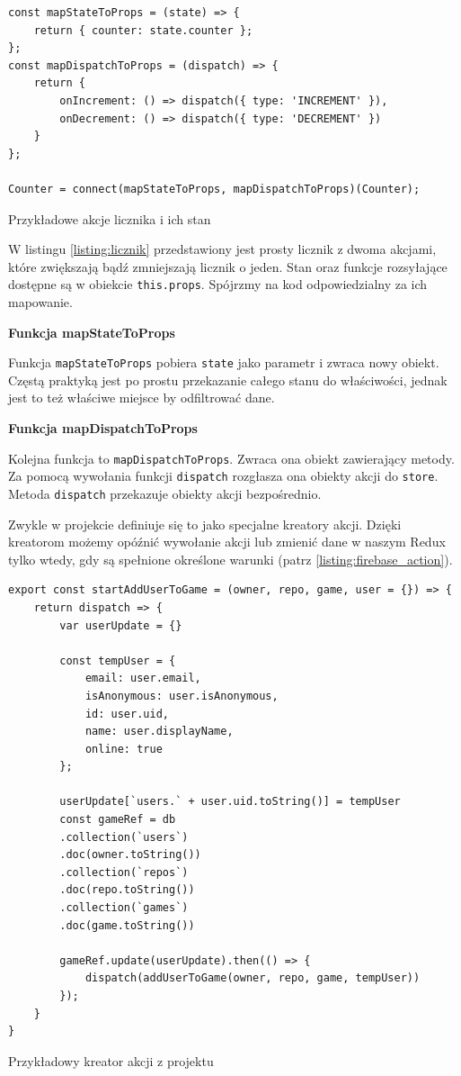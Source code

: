 \begin{listing}
\begin{verbatim}
const mapStateToProps = (state) => {
    return { counter: state.counter };
};
const mapDispatchToProps = (dispatch) => {
    return {
        onIncrement: () => dispatch({ type: 'INCREMENT' }),
        onDecrement: () => dispatch({ type: 'DECREMENT' })
    }
};

Counter = connect(mapStateToProps, mapDispatchToProps)(Counter);
\end{verbatim}
\caption{Przykładowe akcje licznika i ich stan} \label{listing:licznik}
\end{listing}

W listingu \ref{listing:licznik} przedstawiony jest prosty licznik z dwoma akcjami,
które zwiększają bądź zmniejszają licznik o jeden.
Stan oraz funkcje rozsyłające dostępne są w obiekcie \texttt{this.props}.
Spójrzmy na kod odpowiedzialny za ich mapowanie.
\begin{center}
	\textbf{Funkcja mapStateToProps}
\end{center}
Funkcja \texttt{mapStateToProps} pobiera \texttt{state} jako parametr i zwraca nowy obiekt.
Częstą praktyką jest po prostu przekazanie całego stanu do właściwości,
jednak jest to też właściwe miejsce by odfiltrować dane.
\begin{center}
	\textbf{Funkcja mapDispatchToProps}
\end{center}
Kolejna funkcja to \texttt{mapDispatchToProps}. Zwraca ona obiekt zawierający metody.
Za pomocą wywołania funkcji \texttt{dispatch} rozgłasza ona obiekty akcji do \texttt{store}.
Metoda \texttt{dispatch} przekazuje obiekty akcji bezpośrednio.

Zwykle w projekcie definiuje się to jako specjalne kreatory akcji.
Dzięki kreatorom możemy opóźnić wywołanie akcji lub zmienić dane w naszym Redux tylko wtedy,
gdy są spełnione określone warunki (patrz \ref{listing:firebase_action}).

\begin{listing}
\begin{verbatim}
export const startAddUserToGame = (owner, repo, game, user = {}) => {
    return dispatch => {
        var userUpdate = {}

        const tempUser = {
            email: user.email,
            isAnonymous: user.isAnonymous,
            id: user.uid,
            name: user.displayName,
            online: true
        };

        userUpdate[`users.` + user.uid.toString()] = tempUser
        const gameRef = db
        .collection(`users`)
        .doc(owner.toString())
        .collection(`repos`)
        .doc(repo.toString())
        .collection(`games`)
        .doc(game.toString())

        gameRef.update(userUpdate).then(() => {
            dispatch(addUserToGame(owner, repo, game, tempUser))
        });
    }
}
\end{verbatim}
\caption{Przykładowy kreator akcji z projektu} \label{listing:firebase_action}
\end{listing}

